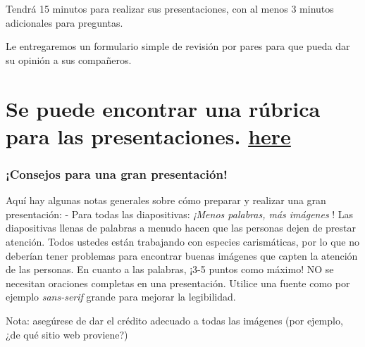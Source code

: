 \documentclass[
]{article}
\begin{document}
Tendrá 15 minutos para realizar sus presentaciones, con al menos 3
minutos adicionales para preguntas.

Le entregaremos un formulario simple de revisión por pares para que
pueda dar su opinión a sus compañeros.

\hypertarget{se-puede-encontrar-una-ruxfabrica-para-las-presentaciones.-here}{%
\section{\texorpdfstring{Se puede encontrar una rúbrica para las
presentaciones.
\href{presentationProject_rubric.docx}{here}}{Se puede encontrar una rúbrica para las presentaciones. here}}\label{se-puede-encontrar-una-ruxfabrica-para-las-presentaciones.-here}}

\hypertarget{consejos-para-una-gran-presentaciuxf3n}{%
\subsubsection{¡Consejos para una gran
presentación!}\label{consejos-para-una-gran-presentaciuxf3n}}

Aquí hay algunas notas generales sobre cómo preparar y realizar una gran
presentación: - Para todas las diapositivas: \emph{¡Menos palabras, más
imágenes }! Las diapositivas llenas de palabras a menudo hacen que las
personas dejen de prestar atención. Todos ustedes están trabajando con
especies carismáticas, por lo que no deberían tener problemas para
encontrar buenas imágenes que capten la atención de las personas. En
cuanto a las palabras, ¡3-5 puntos como máximo! NO se necesitan
oraciones completas en una presentación. Utilice una fuente como por
ejemplo \emph{sans-serif} grande para mejorar la legibilidad.

Nota: asegúrese de dar el crédito adecuado a todas las imágenes (por
ejemplo, ¿de qué sitio web proviene?)
\end{document}
